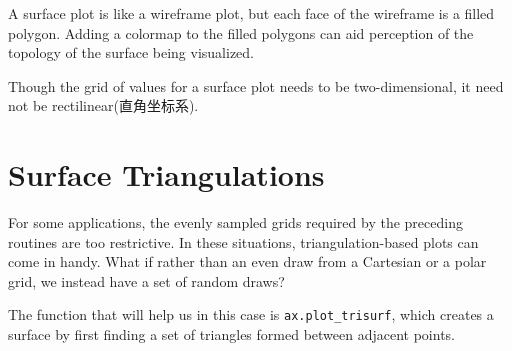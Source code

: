 A surface plot is like a wireframe plot, but each face of the wireframe is a filled polygon. Adding a colormap to the filled polygons can aid perception of the topology of
the surface being visualized.

Though the grid of values for a surface plot needs to be two-dimensional, it need not
be rectilinear(直角坐标系).

\section{Surface Triangulations}
For some applications, the evenly sampled grids required by the preceding routines
are too restrictive. In these situations, triangulation-based plots can come in handy.
What if rather than an even draw from a Cartesian or a polar grid, we instead have a
set of random draws?


The function that will help us in this case is
\verb|ax.plot_trisurf|, which creates a surface by first finding a set of triangles formed
between adjacent points.


